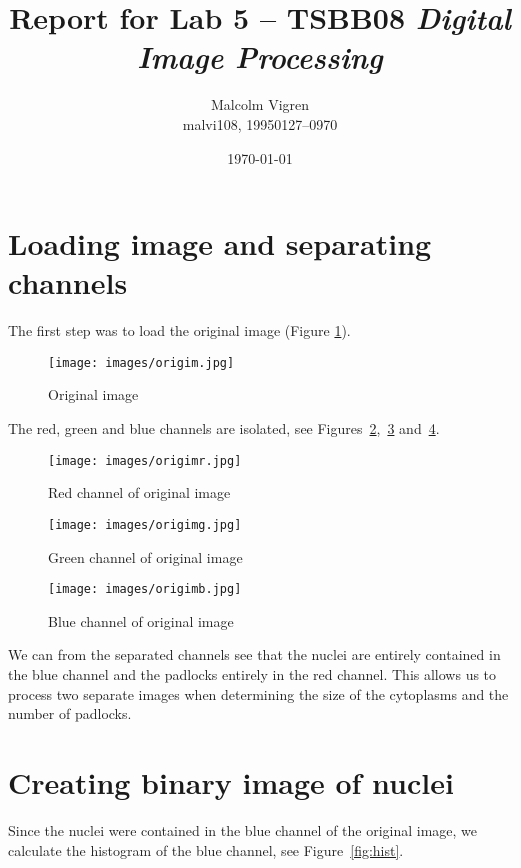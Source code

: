 \documentclass[twocolumn]{article}
\title{Report for Lab 5 -- TSBB08 \emph{Digital Image Processing}}
\author{Malcolm Vigren \\ malvi108, 19950127--0970 }
\date{\today}
\begin{document}
\maketitle

\section{Loading image and separating channels}

The first step was to load the original image (Figure \ref{fig:origim}).

\begin{figure}[h!]
    \centering
    \texttt{[image: images/origim.jpg]}
    \caption{Original image}
    \label{fig:origim}
\end{figure}

The red, green and blue channels are isolated, see
Figures~\ref{fig:origimr},~\ref{fig:origimg} and~\ref{fig:origimb}.

\begin{figure}[h!]
    \centering
    \texttt{[image: images/origimr.jpg]}
    \caption{Red channel of original image}
    \label{fig:origimr}
\end{figure}

\begin{figure}[h!]
    \centering
    \texttt{[image: images/origimg.jpg]}
    \caption{Green channel of original image}
    \label{fig:origimg}
\end{figure}

\begin{figure}[h!]
    \centering
    \texttt{[image: images/origimb.jpg]}
    \caption{Blue channel of original image}
    \label{fig:origimb}
\end{figure}

We can from the separated channels see that the nuclei are entirely contained
in the blue channel and the padlocks entirely in the red channel. This allows
us to process two separate images when determining the size of the cytoplasms
and the number of padlocks.

\section{Creating binary image of nuclei}

Since the nuclei were contained in the blue channel of the original image,
we calculate the histogram of the blue channel, see Figure~\ref{fig:hist}.
\end{document}
